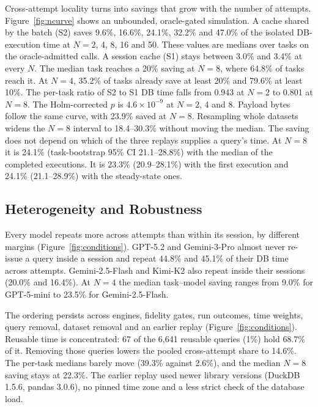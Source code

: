 Cross-attempt locality turns into savings that grow with the number of attempts. Figure~\ref{fig:ncurve} shows an
unbounded, oracle-gated simulation. A cache shared by the batch (S2) saves 9.6\%, 16.6\%, 24.1\%, 32.2\% and 47.0\%
of the isolated DB-execution time at $N=2$, 4, 8, 16 and 50. These values are medians over tasks on the
oracle-admitted calls. A session cache (S1) stays between 3.0\% and 3.4\% at every $N$. The median task reaches a
20\% saving at $N=8$, where 64.8\% of tasks reach it. At $N=4$, 35.2\% of tasks already save at least 20\% and
79.6\% at least 10\%. The per-task ratio of S2 to S1 DB time falls from 0.943 at $N=2$ to 0.801 at $N=8$. The Holm-corrected $p$ is $4.6\times10^{-9}$ at $N=2$, 4 and 8. Payload bytes follow the same curve, with 23.9\% saved at
$N=8$. Resampling whole datasets widens the $N=8$ interval to 18.4--30.3\% without moving the median. The saving does
not depend on which of the three replays supplies a query's time. At $N=8$ it is 24.1\% (task-bootstrap 95\% CI
21.1--28.8\%) with the median of the completed executions. It is 23.3\% (20.9--28.1\%) with the first execution and
24.1\% (21.1--28.9\%) with the steady-state ones.

\subsection{Heterogeneity and Robustness}
\label{sec:robust}



Every model repeats more across attempts than within its session, by different margins
(Figure~\ref{fig:conditions}). GPT-5.2 and Gemini-3-Pro almost never re-issue a query inside a session and repeat
44.8\% and 45.1\% of their DB time across attempts. Gemini-2.5-Flash and Kimi-K2 also repeat inside their sessions
(20.0\% and 16.4\%). At $N=4$ the median task--model saving ranges from 9.0\% for GPT-5-mini to 23.5\% for
Gemini-2.5-Flash.

The ordering persists across engines, fidelity gates, run outcomes, time weights, query removal, dataset removal and
an earlier replay (Figure~\ref{fig:conditions}). Reusable time is concentrated: 67 of the 6,641 reusable queries
(1\%) hold 68.7\% of it. Removing those queries lowers the pooled cross-attempt share to 14.6\%. The per-task medians
barely move (39.3\% against 2.6\%), and the median $N=8$ saving stays at 22.3\%. The earlier replay used newer
library versions (DuckDB 1.5.6, pandas 3.0.6), no pinned time zone and a less strict check of the database load.

